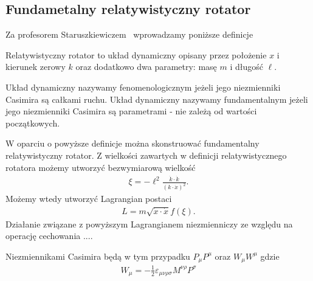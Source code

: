 \subsection{Fundametalny relatywistyczny rotator}
Za profesorem Staruszkiewiczem~\cite{star2008} wprowadzamy poniższe definicje
\begin{definition}
Relatywistyczny rotator to układ dynamiczny
 opisany przez położenie $x$ i kierunek
zerowy $k$ oraz dodatkowo dwa parametry: masę $m$ i długość $\ell$.
\end{definition}
\begin{definition}
Układ dynamiczny  nazywamy fenomenologicznym jeżeli jego niezmienniki Casimira są 
całkami ruchu. Układ dynamiczny nazywamy fundamentalnym jeżeli jego niezmienniki
Casimira są parametrami - nie zależą od wartości początkowych.
\end{definition}
W oparciu o powyższe definicje można skonstruować fundamentalny
relatywistyczny rotator. Z wielkości zawartych w definicji relatywistycznego 
rotatora możemy utworzyć bezwymiarową wielkość
\begin{align}
\xi = - \ell^2 \frac{\dot{k} \cdot \dot{k}}{ ( k \cdot \dot{x})^2 }.
\end{align}
Możemy wtedy utworzyć Lagrangian postaci
\begin{align}
L = m \sqrt{ \dot{x} \cdot \dot{x} } f( \xi ) .
\end{align}
Działanie związane z powyższym Lagrangianem 
niezmienniczy ze względu na operację cechowania
....

Niezmiennikami Casimira będą w tym przypadku $P_\mu P^\mu$ oraz
$W_\mu W^\mu$ gdzie 
\begin{align}
W_\mu = - \frac{1}{2} \varepsilon_{\mu\nu\rho\sigma}
M^{\nu\rho} P^\sigma
\end{align}


